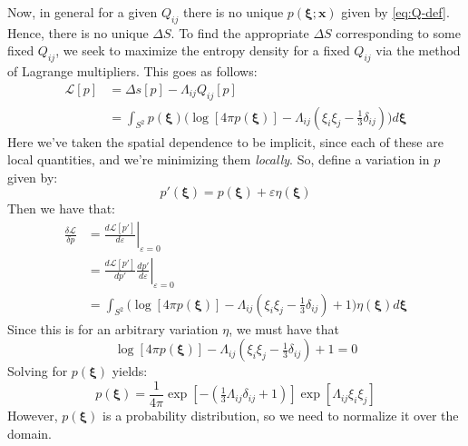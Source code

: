 \documentclass[reqno]{article}
\begin{document}
	Now, in general for a given $Q_{ij}$ there is no unique $p(\mathbf{\xi} ; \mathbf{x})$ given by \eqref{eq:Q-def}. 
	Hence, there is no unique $\Delta S$.
	To find the appropriate $\Delta S$ corresponding to some fixed $Q_{ij}$, we seek to maximize the entropy density for a fixed $Q_{ij}$ via the method of Lagrange multipliers. 
	This goes as follows:
	\begin{equation}
	\begin{split}
		\mathcal{L} [p]
		&= \Delta s [p] - \Lambda_{ij} Q_{ij} [p] \\
		&= \int_{S^2} p( \mathbf{\xi}) 
		\biggl(
		\log \left[ 4\pi p(\mathbf{\xi}) \right]
		- \Lambda_{ij} \left( \xi_i \xi_j - \tfrac13 \delta_{ij} \right)
		\biggr) d\mathbf{\xi}
	\end{split}
	\end{equation}
	Here we've taken the spatial dependence to be implicit, since each of these are local quantities, and we're minimizing them \textit{locally}.
	So, define a variation in $p$ given by:
	\begin{equation}
		p'(\mathbf{\xi}) 
		= p(\mathbf{\xi}) + \varepsilon \eta(\mathbf{\xi})
	\end{equation}
	Then we have that:
	\begin{equation}
	\begin{split}
		\frac{\delta \mathcal{L}}{\delta p}
		&= \left.\frac{d \mathcal{L}[p']}{d \varepsilon} \right|_{\varepsilon = 0} \\
		&= \left.\frac{d \mathcal{L} [p']}{d p'} \frac{d p'}{d \varepsilon} \right|_{\varepsilon = 0} \\
		&= \int_{S^2} \biggl(
		\log \left[ 4\pi p(\mathbf{\xi}) \right]
		- \Lambda_{ij} \left( \xi_i \xi_j - \tfrac13 \delta_{ij} \right)
		+ 1
		\biggr) \eta(\mathbf{\xi}) d \mathbf{\xi}
	\end{split}
	\end{equation}
	Since this is for an arbitrary variation $\eta$, we must have that
	\begin{equation}
	\log \left[ 4\pi p(\mathbf{\xi}) \right]
	- \Lambda_{ij} \left( \xi_i \xi_j - \tfrac13 \delta_{ij} \right)
	+ 1
	= 0
	\end{equation}
	Solving for $p(\mathbf{\xi})$ yields:
	\begin{equation}
		p(\mathbf{\xi}) 
		= \frac{1}{4 \pi}
		\exp \left[
		- \left(\tfrac13 \Lambda_{ij} \delta_{ij} + 1\right)
		\right]
		\exp\left[
		\Lambda_{ij} \xi_i \xi_j
		\right]
	\end{equation}
	However, $p(\mathbf{\xi})$ is a probability distribution, so we need to normalize it over the domain.
\end{document}

